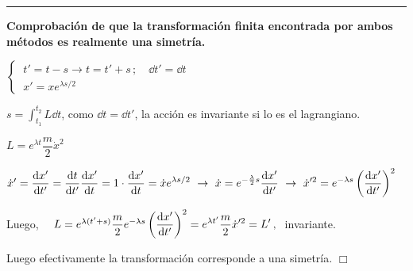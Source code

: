 \begin{center}\rule{200pt}{0.1pt}\end{center}


\vspace{5mm} \textbf{Comprobación de que la transformación finita encontrada por  ambos métodos es realmente una simetría.}

$\begin{cases} \ t'=t-s \to t=t'+s \, ; \quad \dd t'=\dd t \\ \ x'=xe^{\lambda s/2} \end{cases}$

$s=\displaystyle \int_{t_1}^{t_2} L \dd t$, como $\dd t=\dd t'$, la acción es invariante si lo es el lagrangiano.

$L=e^{\lambda t} \dfrac m 2 \dot x^2$

$\dot x'=\displaystyle \dv{x'}{t'}=\dv{t}{t'}\dv{x'}{t}=1\cdot \dv{x'}{t}=\dot x e^{\lambda s/2} \ \to \ \dot x=e^{-\frac \lambda 2 s} \dv{x'}{t'} \ \to \ \dot x'^2=e^{-\lambda s} \displaystyle \left( \dv{x'}{t'} \right)^2 $

Luego,  $\quad L=e^{\lambda(t'+s)} \dfrac m 2 e^{-\lambda s} \displaystyle \left( \dv{x'}{t'} \right)^2=e^{\lambda t'} \dfrac m 2 \dot x'^2=L'\, , \ $ invariante.

Luego efectivamente la transformación corresponde a una simetría. \hspace{5cm}$\Box$


